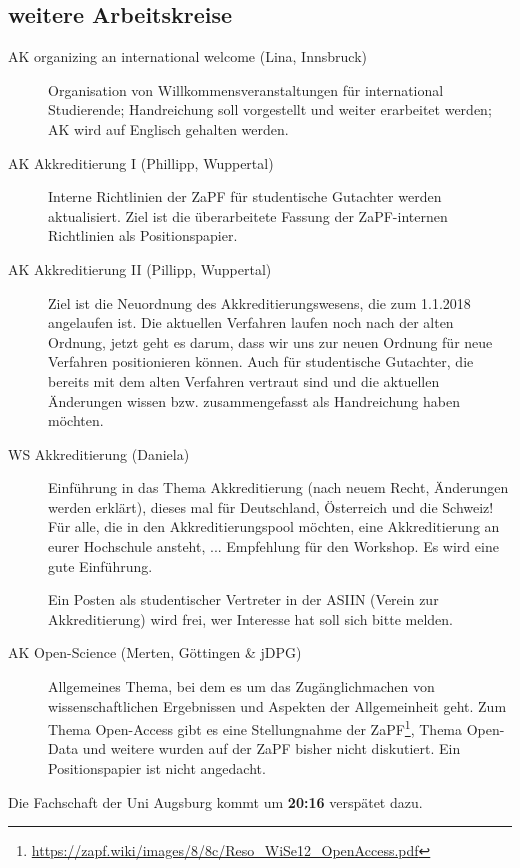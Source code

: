   \subsection{weitere Arbeitskreise}
    \begin{description}
      \item[AK organizing an international welcome (Lina, Innsbruck)]
        Organisation von Willkommensveranstaltungen für international Studierende; Handreichung soll vorgestellt und weiter erarbeitet werden; AK wird auf Englisch gehalten werden.
      \item[AK Akkreditierung I (Phillipp, Wuppertal)]
        Interne Richtlinien der ZaPF für studentische Gutachter werden aktualisiert. Ziel ist die überarbeitete Fassung der ZaPF-internen Richtlinien als Positionspapier.
      \item[AK Akkreditierung II (Pillipp, Wuppertal)]
        Ziel ist die Neuordnung des Akkreditierungswesens, die zum 1.1.2018 angelaufen ist. Die aktuellen Verfahren laufen noch nach der alten Ordnung, jetzt geht es darum, dass wir uns zur neuen Ordnung für neue Verfahren positionieren können.
        Auch für studentische Gutachter, die bereits mit dem alten Verfahren vertraut sind und die aktuellen Änderungen wissen bzw. zusammengefasst als Handreichung haben möchten.
      \item[WS Akkreditierung (Daniela)]
        Einführung in das Thema Akkreditierung (nach neuem Recht, Änderungen werden erklärt), dieses mal für Deutschland, Österreich und die Schweiz!
        Für alle, die in den Akkreditierungspool möchten, eine Akkreditierung an eurer Hochschule ansteht, ... Empfehlung für den Workshop. Es wird eine gute Einführung.
        \begin{info}{}
          Ein Posten als studentischer Vertreter in der ASIIN (Verein zur Akkreditierung) wird frei, wer Interesse hat soll sich bitte melden.
        \end{info}
      \item[AK Open-Science (Merten, Göttingen \& jDPG)]
        Allgemeines Thema, bei dem es um das Zugänglichmachen von wissenschaftlichen Ergebnissen und Aspekten der Allgemeinheit geht. Zum Thema Open-Access gibt es eine Stellungnahme der ZaPF\footnote{\url{https://zapf.wiki/images/8/8c/Reso_WiSe12_OpenAccess.pdf}}, Thema Open-Data und weitere wurden auf der ZaPF bisher nicht diskutiert.
        Ein Positionspapier ist nicht angedacht.
    \end{description}

    \begin{info}{}
      Die Fachschaft der Uni Augsburg kommt um \textbf{20:16} verspätet dazu.
    \end{info}

